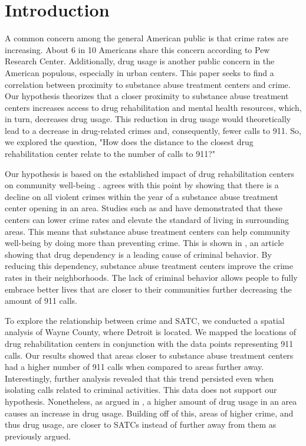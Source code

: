 \documentclass[12pt]{article}
\begin{document}
\bigskip
\section{Introduction} \label{sec:introduction}
A common concern among the general American public is that crime rates are increasing. About 6 in 10 Americans share this concern according to Pew Research Center. Additionally, drug usage is another public concern in the American populous, especially in urban centers. This paper seeks to find a correlation between proximity to  substance abuse treatment centers and crime. Our hypothesis theorizes that a closer proximity to substance abuse treatment centers increases access to drug rehabilitation and mental health resources, which, in turn, decreases drug usage. This reduction in drug usage would theoretically lead to a decrease in drug-related crimes and, consequently, fewer calls to 911. So, we explored the question, "How does the distance to the closest drug rehabilitation center relate to the number of calls to 911?" 

Our hypothesis is based on the established impact of drug rehabilitation centers on community well-being . \cite{SAT_centers_and_crime} agrees with this point by showing that there is a decline on all violent crimes within the year of a substance abuse treatment center opening in an area.  Studies such as \cite{drugs_and_crime} and \cite{drugs_crime_space_time} have demonstrated that these centers can lower crime rates and elevate the standard of living in surrounding areas. This means that substance abuse treatment centers can help community well-being by doing more than preventing crime. This is shown in \cite{mental_healthcare_and_crime}, an article showing that drug dependency is a leading cause of criminal behavior. By reducing this dependency, substance abuse treatment centers improve the crime rates in their neighborhoods. The lack of criminal behavior allows people to fully embrace better lives that are closer to their communities further decreasing the amount of 911 calls. 

To explore the relationship between crime and SATC, we conducted a spatial analysis of Wayne County, where Detroit is located. We mapped the locations of drug rehabilitation centers in conjunction with the data points representing 911 calls. Our results showed that areas closer to substance abuse treatment centers had a higher number of 911 calls when compared to areas further away.  Interestingly, further analysis revealed that this trend persisted even when isolating calls related to criminal activities. This data does not support our hypothesis. Nonetheless, as argued in \cite{Socioeconomic-Determinants}, a higher amount of drug usage in an area causes an increase in drug usage. Building off of this, areas of higher crime, and thus drug usage, are closer to SATCs instead of further away from them as previously argued. 
\end{document}
